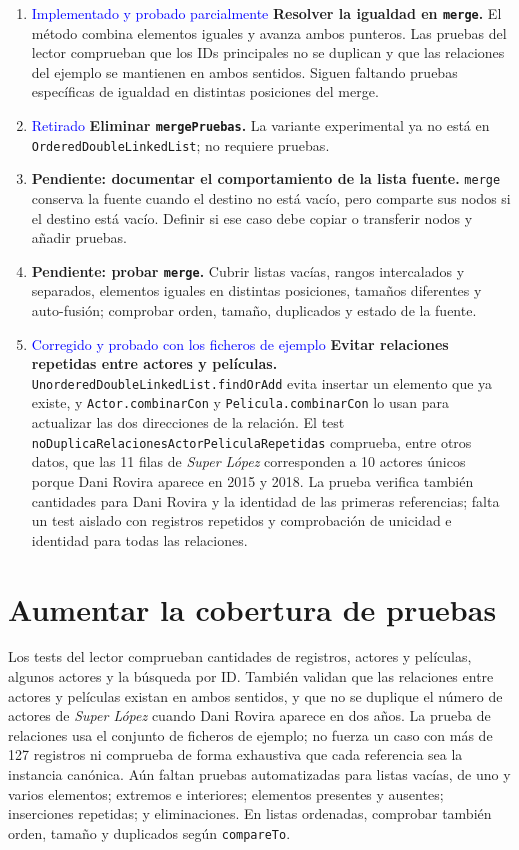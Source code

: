 \documentclass[a4paper,11pt]{report}
\begin{document}
\begin{enumerate}
    \item \textcolor{blue}{Implementado y probado parcialmente} \textbf{Resolver la igualdad en \texttt{merge}.} El método combina elementos iguales y avanza ambos punteros. Las pruebas del lector comprueban que los IDs principales no se duplican y que las relaciones del ejemplo se mantienen en ambos sentidos. Siguen faltando pruebas específicas de igualdad en distintas posiciones del merge.
    \item \textcolor{blue}{Retirado} \textbf{Eliminar \texttt{mergePruebas}.} La variante experimental ya no está en \texttt{OrderedDouble\allowbreak LinkedList}; no requiere pruebas.
    \item \textbf{Pendiente: documentar el comportamiento de la lista fuente.} \texttt{merge} conserva la fuente cuando el destino no está vacío, pero comparte sus nodos si el destino está vacío. Definir si ese caso debe copiar o transferir nodos y añadir pruebas.
    \item \textbf{Pendiente: probar \texttt{merge}.} Cubrir listas vacías, rangos intercalados y separados, elementos iguales en distintas posiciones, tamaños diferentes y auto-fusión; comprobar orden, tamaño, duplicados y estado de la fuente.
    \item \textcolor{blue}{Corregido y probado con los ficheros de ejemplo} \textbf{Evitar relaciones repetidas entre actores y películas.} \texttt{UnorderedDoubleLinkedList.findOrAdd} evita insertar un elemento que ya existe, y \texttt{Actor.combinarCon} y \texttt{Pelicula.combinarCon} lo usan para actualizar las dos direcciones de la relación. El test \texttt{noDuplicaRelacionesActorPeliculaRepetidas} comprueba, entre otros datos, que las 11 filas de \textit{Super López} corresponden a 10 actores únicos porque Dani Rovira aparece en 2015 y 2018. La prueba verifica también cantidades para Dani Rovira y la identidad de las primeras referencias; falta un test aislado con registros repetidos y comprobación de unicidad e identidad para todas las relaciones.
\end{enumerate}

\section{Aumentar la cobertura de pruebas}

Los tests del lector comprueban cantidades de registros, actores y películas, algunos actores y la búsqueda por ID. También validan que las relaciones entre actores y películas existan en ambos sentidos, y que no se duplique el número de actores de \textit{Super López} cuando Dani Rovira aparece en dos años. La prueba de relaciones usa el conjunto de ficheros de ejemplo; no fuerza un caso con más de 127 registros ni comprueba de forma exhaustiva que cada referencia sea la instancia canónica. Aún faltan pruebas automatizadas para listas vacías, de uno y varios elementos; extremos e interiores; elementos presentes y ausentes; inserciones repetidas; y eliminaciones. En listas ordenadas, comprobar también orden, tamaño y duplicados según \texttt{compareTo}.
\end{document}
